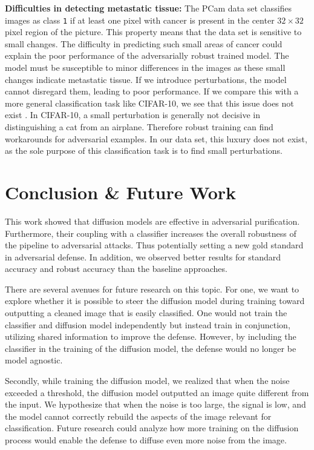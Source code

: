 \documentclass[twocolumn]{article}
\begin{document}
\textbf{Difficulties in detecting metastatic tissue:}
The PCam data set classifies images as class \texttt{1} if at least one pixel with cancer is present in the center $32\times 32$ pixel region of the picture. This property means that the data set is sensitive to small changes. The difficulty in predicting such small areas of cancer could explain the poor performance of the adversarially robust trained model. The model must be susceptible to minor differences in the images as these small changes indicate metastatic tissue. If we introduce perturbations, the model cannot disregard them, leading to poor performance. If we compare this with a more general classification task like CIFAR-10, we see that this issue does not exist \cite{DiffPure}. In CIFAR-10, a small perturbation is generally not decisive in distinguishing a cat from an airplane. Therefore robust training can find workarounds for adversarial examples. In our data set, this luxury does not exist, as the sole purpose of this classification task is to find small perturbations. 


\section{Conclusion \& Future Work}
This work showed that diffusion models are effective in adversarial purification. Furthermore, their coupling with a classifier increases the overall robustness of the pipeline to adversarial attacks. Thus potentially setting a new gold standard in adversarial defense. In addition, we observed better results for standard accuracy and robust accuracy than the baseline approaches.

There are several avenues for future research on this topic. For one, we want to explore whether it is possible to steer the diffusion model during training toward outputting a cleaned image that is easily classified. One would not train the classifier and diffusion model independently but instead train in conjunction, utilizing shared information to improve the defense. However, by including the classifier in the training of the diffusion model, the defense would no longer be model agnostic.

Secondly, while training the diffusion model, we realized that when the noise exceeded a threshold, the diffusion model outputted an image quite different from the input. We hypothesize that when the noise is too large, the signal is low, and the model cannot correctly rebuild the aspects of the image relevant for classification. Future research could analyze how more training on the diffusion process would enable the defense to diffuse even more noise from the image.


\onecolumn


\end{document}
